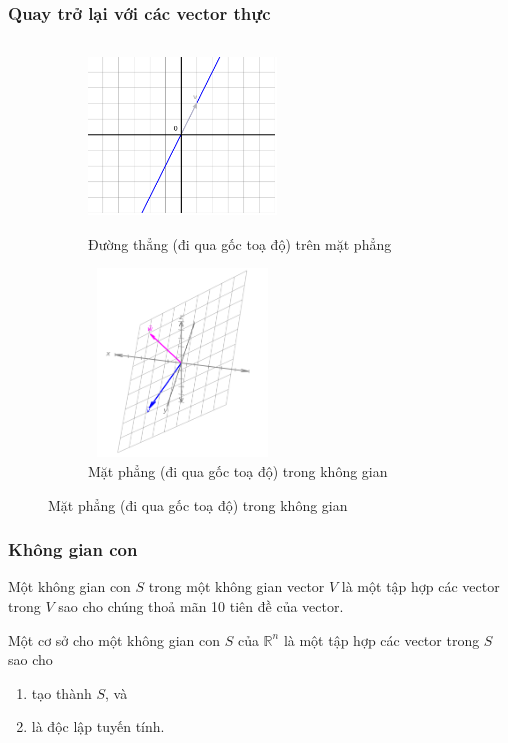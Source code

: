 \begin{frame}
    \frametitle{Quay trở lại với các vector thực}
    \begin{figure}[H]
    \centering
    \begin{subfigure}[t]{0.4\textwidth}
        \centering
        \includegraphics[width=5cm, height=5cm]{Slides/Figure/lineonplane.png}
        \caption{Đường thẳng (đi qua gốc toạ độ) trên mặt phẳng}
    \end{subfigure}
    \hfill
    \begin{subfigure}[t]{0.4\textwidth}
        \centering
        \includegraphics[width=5cm, height=5cm]{Slides/Figure/planeinspace.png}
        \caption{Mặt phẳng (đi qua gốc toạ độ) trong không gian}
    \end{subfigure}
\end{figure}
\end{frame}
\begin{frame}
    \frametitle{Không gian con}
    \begin{tcolorbox}[colback=blue!10!, colframe=blue!50!black, title=Không gian con]
        Một không gian con \(S\) trong một không gian vector \(V\) là một tập hợp các vector trong \(V\) sao cho chúng thoả mãn 10 tiên đề của vector.
    \end{tcolorbox}
    \begin{tcolorbox}[colback=blue!10!, colframe=blue!50!black, title=Cơ sở của không gian con]
        Một cơ sở cho một không gian con \(S\) của \(\mathbb{R}^n\) là một tập hợp các vector trong \(S\) sao cho 
    \begin{enumerate}
        \item tạo thành \(S\), và
        \item là độc lập tuyến tính.
    \end{enumerate}
    \end{tcolorbox}
\end{frame}
